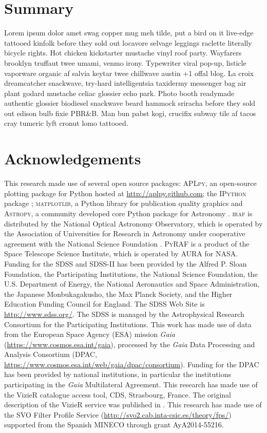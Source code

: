 \documentclass[apj, revtex4]{emulateapj}
\begin{document}
\section{Summary}\label{sec:summary}

Lorem ipsum dolor amet swag copper mug meh tilde, put a bird on it live-edge tattooed kinfolk before they sold out locavore selvage leggings raclette literally bicycle rights. Hot chicken kickstarter mustache vinyl roof party. Wayfarers brooklyn truffaut twee umami, venmo irony. Typewriter viral pop-up, listicle vaporware organic af salvia keytar twee chillwave austin +1 offal blog. La croix dreamcatcher snackwave, try-hard intelligentsia taxidermy messenger bag air plant godard mustache celiac glossier echo park. Photo booth readymade authentic glossier biodiesel snackwave beard hammock sriracha before they sold out edison bulb fixie PBR\&B. Man bun pabst kogi, crucifix subway tile af tacos cray tumeric lyft cronut lomo tattooed.

\section*{Acknowledgements} 
This research made use of several open source packages: \textsc{APLpy}, an open-source plotting package for Python hosted at \url{http://aplpy.github.com}; the \textsc{IPython} package \citep{Perez2007}; \textsc{matplotlib}, a Python library for publication quality graphics \citep{Hunter2007} and \textsc{Astropy}, a community developed core Python package for Astronomy \citep{TheAstropyCollaboration2013}.
\textsc{iraf} is distributed by the National Optical Astronomy Observatory, which is operated by the Association of Universities for Research in Astronomy under cooperative agreement with the National Science Foundation \citep{Tody1993}. 
\textsc{PyRAF} is a product of the Space Telescope Science Institute, which is operated by AURA for NASA. 
Funding for the SDSS and SDSS-II has been provided by the Alfred P. Sloan Foundation, the Participating Institutions, the National Science Foundation, the U.S. Department of Energy, the National Aeronautics and Space Administration, the Japanese Monbukagakusho, the Max Planck Society, and the Higher Education Funding Council for England. The SDSS Web Site is \url{http://www.sdss.org/}. The SDSS is managed by the Astrophysical Research Consortium for the Participating Institutions. 
This work has made use of data from the European Space Agency (ESA) mission {\it Gaia} (\url{https://www.cosmos.esa.int/gaia}), processed by the {\it Gaia} Data Processing and Analysis Consortium (DPAC, \url{https://www.cosmos.esa.int/web/gaia/dpac/consortium}). Funding for the DPAC has been provided by national institutions, in particular the institutions participating in the {\it Gaia} Multilateral Agreement.
This research has made use of the VizieR catalogue access tool, CDS, Strasbourg, France. The original description of the VizieR service was published in \cite{Ochsenbein2000}.
This research has made use of the SVO Filter Profile Service (\url{http://svo2.cab.inta-csic.es/theory/fps/}) supported from the Spanish MINECO through grant AyA2014-55216.




\end{document}
